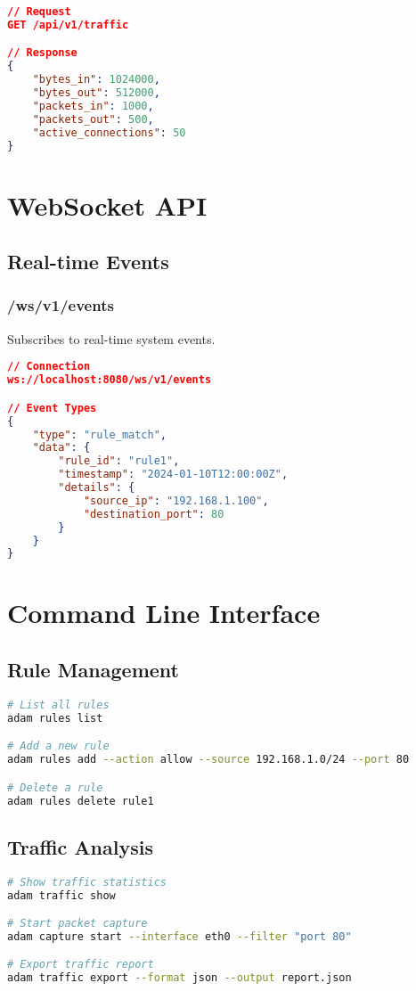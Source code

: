 \documentclass{article}
\begin{document}
\begin{lstlisting}[language=json]
// Request
GET /api/v1/traffic

// Response
{
    "bytes_in": 1024000,
    "bytes_out": 512000,
    "packets_in": 1000,
    "packets_out": 500,
    "active_connections": 50
}
\end{lstlisting}

\section{WebSocket API}

\subsection{Real-time Events}
\subsubsection{/ws/v1/events}
Subscribes to real-time system events.

\begin{lstlisting}[language=json]
// Connection
ws://localhost:8080/ws/v1/events

// Event Types
{
    "type": "rule_match",
    "data": {
        "rule_id": "rule1",
        "timestamp": "2024-01-10T12:00:00Z",
        "details": {
            "source_ip": "192.168.1.100",
            "destination_port": 80
        }
    }
}
\end{lstlisting}

\section{Command Line Interface}

\subsection{Rule Management}
\begin{lstlisting}[language=bash]
# List all rules
adam rules list

# Add a new rule
adam rules add --action allow --source 192.168.1.0/24 --port 80

# Delete a rule
adam rules delete rule1
\end{lstlisting}

\subsection{Traffic Analysis}
\begin{lstlisting}[language=bash]
# Show traffic statistics
adam traffic show

# Start packet capture
adam capture start --interface eth0 --filter "port 80"

# Export traffic report
adam traffic export --format json --output report.json
\end{lstlisting}
\end{document}
